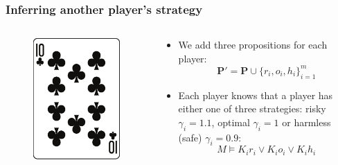 \documentclass[10pt]{beamer}
\begin{document}
\begin{frame}
\frametitle{Inferring another player's strategy}
 \begin{columns}
  \begin{column}{3cm}
   \begin{figure}
    \includegraphics[width=\linewidth]{im/clubs_10.eps}
   \end{figure}
  \end{column}
  
  \begin{column}{7cm}
    \begin{itemize}[label=$\clubsuit$]
     \item We add three propositions for each player: 
     $$\boldsymbol{P}'=\boldsymbol{P} \cup \{r_i,o_i,h_i\}_{i=1}^m$$
     \item Each player knows that a player has either one of three strategies: risky $\gamma_i = 1.1$, optimal $\gamma_i = 1$ or harmless (safe) $\gamma_i = 0.9$:
    \begin{equation*}
    M \models K_i r_i \vee K_i o_i \vee K_i h_i 
    \end{equation*}
    

\end{itemize}
\end{column}
\end{columns}
\end{frame}
\end{document}
